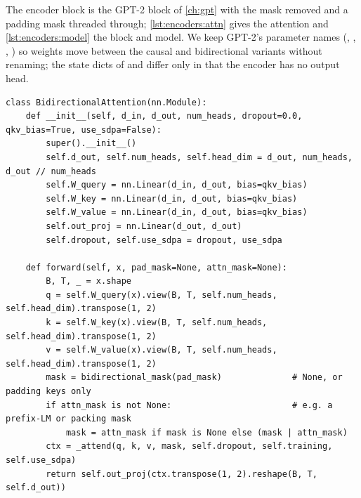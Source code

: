 The encoder block is the GPT-2 block of \cref{ch:gpt} with the mask removed and a padding mask
threaded through; \cref{lst:encoders:attn} gives the attention and \cref{lst:encoders:model} the
block and model. We keep GPT-2's parameter names (, , ,
) so weights move between the causal and bidirectional variants without renaming;
the state dicts of  and  differ only in that the encoder has no
output head.

\begin{lstlisting}[caption={Bidirectional attention: the causal attention of \cref{ch:attention} without the triangle.},label={lst:encoders:attn}]
class BidirectionalAttention(nn.Module):
    def __init__(self, d_in, d_out, num_heads, dropout=0.0, qkv_bias=True, use_sdpa=False):
        super().__init__()
        self.d_out, self.num_heads, self.head_dim = d_out, num_heads, d_out // num_heads
        self.W_query = nn.Linear(d_in, d_out, bias=qkv_bias)
        self.W_key = nn.Linear(d_in, d_out, bias=qkv_bias)
        self.W_value = nn.Linear(d_in, d_out, bias=qkv_bias)
        self.out_proj = nn.Linear(d_out, d_out)
        self.dropout, self.use_sdpa = dropout, use_sdpa

    def forward(self, x, pad_mask=None, attn_mask=None):
        B, T, _ = x.shape
        q = self.W_query(x).view(B, T, self.num_heads, self.head_dim).transpose(1, 2)
        k = self.W_key(x).view(B, T, self.num_heads, self.head_dim).transpose(1, 2)
        v = self.W_value(x).view(B, T, self.num_heads, self.head_dim).transpose(1, 2)
        mask = bidirectional_mask(pad_mask)              # None, or padding keys only
        if attn_mask is not None:                        # e.g. a prefix-LM or packing mask
            mask = attn_mask if mask is None else (mask | attn_mask)
        ctx = _attend(q, k, v, mask, self.dropout, self.training, self.use_sdpa)
        return self.out_proj(ctx.transpose(1, 2).reshape(B, T, self.d_out))
\end{lstlisting}

